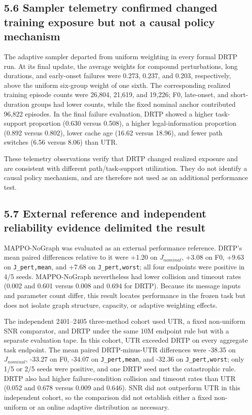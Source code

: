 \subsection{5.6 Sampler telemetry confirmed changed training exposure but not a causal policy mechanism}

The adaptive sampler departed from uniform weighting in every formal DRTP run. At its final update, the average weights for compound perturbations, long durations, and early-onset failures were 0.273, 0.237, and 0.203, respectively, above the uniform six-group weight of one sixth. The corresponding realized training episode counts were 26,804, 21,619, and 19,226; F0, late-onset, and short-duration groups had lower counts, while the fixed nominal anchor contributed 96,822 episodes. In the final failure evaluation, DRTP showed a higher task-support proportion (0.630 versus 0.508), a higher legal-information proportion (0.892 versus 0.802), lower cache age (16.62 versus 18.96), and fewer path switches (6.56 versus 8.06) than UTR.

These telemetry observations verify that DRTP changed realized exposure and are consistent with different path/task-support utilization. They do not identify a causal policy mechanism, and are therefore not used as an additional performance test.

\subsection{5.7 External reference and independent reliability evidence delimited the result}

MAPPO-NoGraph was evaluated as an external performance reference. DRTP's mean paired differences relative to it were +1.20 on $J_{nominal}$, +3.08 on F0, +9.63 on \texttt{J_pert,mean}, and +7.68 on \texttt{J_pert,worst}; all four endpoints were positive in 4/5 seeds. MAPPO-NoGraph nevertheless had lower collision and timeout rates (0.002 and 0.601 versus 0.008 and 0.694 for DRTP). Because its message inputs and parameter count differ, this result locates performance in the frozen task but does not isolate graph structure, capacity, or adaptive weighting effects.

The independent 2401--2405 three-method cohort used UTR, a fixed non-uniform SNR comparator, and DRTP under the same 10M endpoint rule but with a separate evaluation tape. In this cohort, UTR exceeded DRTP on every aggregate task endpoint. The mean paired DRTP-minus-UTR differences were -38.35 on $J_{nominal}$, -33.27 on F0, -34.07 on \texttt{J_pert,mean}, and -32.36 on \texttt{J_pert,worst}; only 1/5 or 2/5 seeds were positive, and one DRTP seed met the catastrophic rule. DRTP also had higher failure-condition collision and timeout rates than UTR (0.052 and 0.678 versus 0.009 and 0.646). SNR did not outperform UTR in this independent cohort, so the comparison did not establish either a fixed non-uniform or an online adaptive distribution as necessary.


